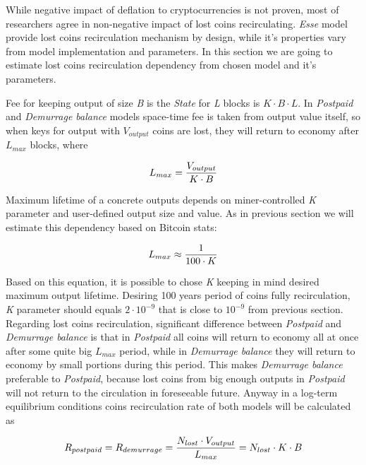 \documentclass[]{article}   %
\newcommand{\esse}{\textit{Esse}}
\newcommand{\state}{\textit{State}}
\begin{document}
While negative impact of deflation to cryptocurrencies is not proven, most of researchers agree in non-negative impact of lost coins recirculating. \esse{} model provide lost coins recirculation mechanism by design, while it's properties vary from model implementation and parameters. In this section we are going to estimate lost coins recirculation dependency from chosen model and it's parameters.

Fee for keeping output of size \textit{B} is the \state{} for \textit{L} blocks is ${K \cdot B \cdot L}$. In \textit{Postpaid} and \textit{Demurrage balance} models space-time fee is taken from output value itself, so when keys for output with \textit{$V_{output}$} coins are lost, they will return to economy after \textit{$L_{max}$} blocks, where

\begin{equation}
{L_{max} = {V_{output} \over K \cdot B}}
\end{equation}

Maximum lifetime of a concrete outputs depends on miner-controlled \textit{K} parameter and user-defined output size and value. As in previous section we will estimate this dependency based on Bitcoin stats:

\begin{equation}
{L_{max} \approx {1 \over 100 \cdot K}}
\end{equation}

Based on this equation, it is possible to chose \textit{K} keeping in mind desired maximum output lifetime. Desiring 100 years period of coins fully recirculation, \textit{K} parameter should equals $2 \cdot 10^{-9}$ that is close to $10^{-9}$ from previous section. Regarding lost coins recirculation, significant difference between \textit{Postpaid} and \textit{Demurrage balance} is that in \textit{Postpaid} all coins will return to economy all at once after some quite big $L_{max}$ period, while in \textit{Demurrage balance} they will return to economy by small portions during this period. This makes \textit{Demurrage balance} preferable to \textit{Postpaid}, because lost coins from big enough outputs in \textit{Postpaid} will not return to the circulation in foreseeable future. Anyway in a log-term equilibrium conditions coins recirculation rate of both models will be calculated as

\begin{equation}
R_{postpaid} = R_{demurrage} = {N_{lost} \cdot V_{output} \over L_{max}} = {N_{lost} \cdot K \cdot B}
\end{equation}
\end{document}
